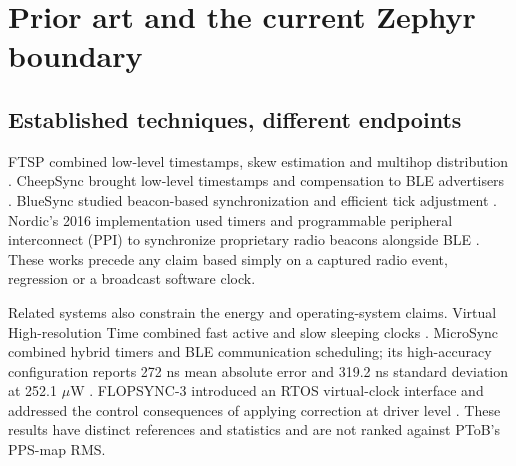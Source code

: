 \documentclass[10pt,letterpaper]{article}
\begin{document}
\section{Prior art and the current Zephyr boundary}
\subsection{Established techniques, different endpoints}
FTSP combined low-level timestamps, skew estimation and multihop distribution \cite{ftsp}. CheepSync brought low-level timestamps and compensation to BLE advertisers \cite{cheep}. BlueSync studied beacon-based synchronization and efficient tick adjustment \cite{blue}. Nordic's 2016 implementation used timers and programmable peripheral interconnect (PPI) to synchronize proprietary radio beacons alongside BLE \cite{nordic}. These works precede any claim based simply on a captured radio event, regression or a broadcast software clock.

Related systems also constrain the energy and operating-system claims. Virtual High-resolution Time combined fast active and slow sleeping clocks \cite{vht}. MicroSync combined hybrid timers and BLE communication scheduling; its high-accuracy configuration reports 272 ns mean absolute error and 319.2 ns standard deviation at 252.1 $\mu$W \cite{micro}. FLOPSYNC-3 introduced an RTOS virtual-clock interface and addressed the control consequences of applying correction at driver level \cite{flop}. These results have distinct references and statistics and are not ranked against PToB's PPS-map RMS.
\end{document}
